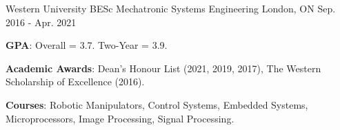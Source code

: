 

\begin{cventries}

  \cventry
    {Western University} %
    {BESc Mechatronic Systems Engineering} %
    {London, ON} %
    {Sep. 2016 - Apr. 2021} %
    {
      \begin{cvitems} %
        \item {\textbf{GPA}: Overall = 3.7. Two-Year = 3.9.}
        \item {\textbf{Academic Awards}: Dean's Honour List (2021, 2019, 2017), The Western Scholarship of Excellence (2016).}
        \item {\textbf{Courses}: Robotic Manipulators, Control Systems, Embedded Systems, Microprocessors, Image Processing, Signal Processing.}
      \end{cvitems}
    }


\end{cventries}
